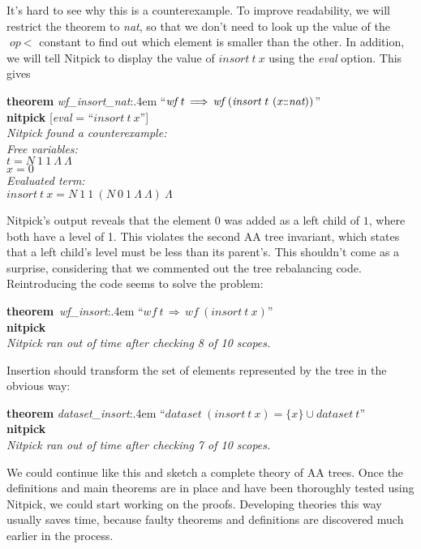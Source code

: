\documentclass[a4paper,12pt]{article}
\def\Colon{\mathord{:\mkern-1.5mu:}}
\begin{document}
It's hard to see why this is a counterexample. To improve readability, we will
restrict the theorem to \textit{nat}, so that we don't need to look up the value
of the $\textit{op}~{<}$ constant to find out which element is smaller than the
other. In addition, we will tell Nitpick to display the value of
$\textit{insort}~t~x$ using the \textit{eval} option. This gives

\prew
\textbf{theorem} \textit{wf\_insort\_nat\/}:\kern.4em ``$\textit{wf}~t\,\Longrightarrow\, \textit{wf}~(\textit{insort}~t~(x\Colon\textit{nat}))$'' \\
\textbf{nitpick} [\textit{eval} = ``$\textit{insort}~t~x$''] \\[2\smallskipamount]
\slshape Nitpick found a counterexample: \\[2\smallskipamount]
\hbox{}\qquad Free variables: \nopagebreak \\
\hbox{}\qquad\qquad $t = N~1~1~\Lambda~\Lambda$ \\
\hbox{}\qquad\qquad $x = 0$ \\
\hbox{}\qquad Evaluated term: \\
\hbox{}\qquad\qquad $\textit{insort}~t~x = N~1~1~(N~0~1~\Lambda~\Lambda)~\Lambda$
\postw

Nitpick's output reveals that the element $0$ was added as a left child of $1$,
where both have a level of 1. This violates the second AA tree invariant, which
states that a left child's level must be less than its parent's. This shouldn't
come as a surprise, considering that we commented out the tree rebalancing code.
Reintroducing the code seems to solve the problem:

\prew
\textbf{theorem}~\textit{wf\_insort\/}:\kern.4em ``$\textit{wf}~t\,\Longrightarrow\, \textit{wf}~(\textit{insort}~t~x)$'' \\
\textbf{nitpick} \\[2\smallskipamount]
{\slshape Nitpick ran out of time after checking 8 of 10 scopes.}
\postw

Insertion should transform the set of elements represented by the tree in the
obvious way:

\prew
\textbf{theorem} \textit{dataset\_insort\/}:\kern.4em
``$\textit{dataset}~(\textit{insort}~t~x) = \{x\} \cup \textit{dataset}~t$'' \\
\textbf{nitpick} \\[2\smallskipamount]
{\slshape Nitpick ran out of time after checking 7 of 10 scopes.}
\postw

We could continue like this and sketch a complete theory of AA trees. Once the
definitions and main theorems are in place and have been thoroughly tested using
Nitpick, we could start working on the proofs. Developing theories this way
usually saves time, because faulty theorems and definitions are discovered much
earlier in the process.
\end{document}
